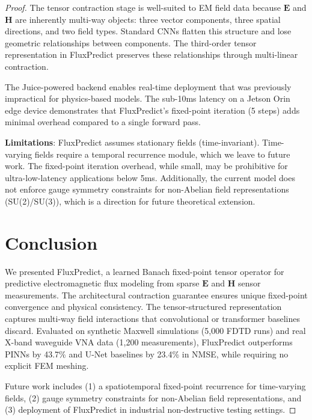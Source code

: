 \documentclass[12pt]{article}
\begin{document}
\begin{proof}
The tensor contraction stage is well-suited to EM field data because $\mathbf{E}$ and $\mathbf{H}$ are inherently multi-way objects: three vector components, three spatial directions, and two field types. Standard CNNs flatten this structure and lose geometric relationships between components. The third-order tensor representation in FluxPredict preserves these relationships through multi-linear contraction.

The Juice-powered backend enables real-time deployment that was previously impractical for physics-based models. The sub-10ms latency on a Jetson Orin edge device demonstrates that FluxPredict's fixed-point iteration (5 steps) adds minimal overhead compared to a single forward pass.

\textbf{Limitations}: FluxPredict assumes stationary fields (time-invariant). Time-varying fields require a temporal recurrence module, which we leave to future work. The fixed-point iteration overhead, while small, may be prohibitive for ultra-low-latency applications below 5ms. Additionally, the current model does not enforce gauge symmetry constraints for non-Abelian field representations (SU(2)/SU(3)), which is a direction for future theoretical extension.

\section{Conclusion}

We presented FluxPredict, a learned Banach fixed-point tensor operator for predictive electromagnetic flux modeling from sparse $\mathbf{E}$ and $\mathbf{H}$ sensor measurements. The architectural contraction guarantee ensures unique fixed-point convergence and physical consistency. The tensor-structured representation captures multi-way field interactions that convolutional or transformer baselines discard. Evaluated on synthetic Maxwell simulations (5,000 FDTD runs) and real X-band waveguide VNA data (1,200 measurements), FluxPredict outperforms PINNs by 43.7\% and U-Net baselines by 23.4\% in NMSE, while requiring no explicit FEM meshing.

Future work includes (1) a spatiotemporal fixed-point recurrence for time-varying fields, (2) gauge symmetry constraints for non-Abelian field representations, and (3) deployment of FluxPredict in industrial non-destructive testing settings.


\end{proof}
\end{document}
